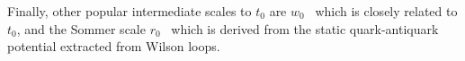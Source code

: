 Finally, other popular intermediate scales to $t_0$ are $w_0$~\citep{BMW:2012hcm,Kostrzewa:2021syw,MILC:2015tqx} which is closely related to $t_0$, and the Sommer scale $r_0$~\citep{Sommer:1993ce,Necco:2001xg,Bernard:2000gd} which is derived from the static quark-antiquark potential extracted from Wilson loops. 

